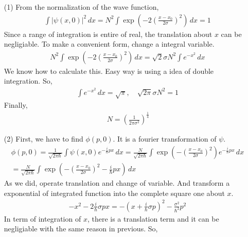 \documentclass[aps,floatfix,nofootinbib,superscriptaddress,fleqn]{revtex4}
\begin{document}
\begin{itemize}
\item[(1)] From the normalization of the wave function,
\begin{align}
          \int |\psi(x,0)|^2\,dx=N^2\int\exp\left(-2{\left(\frac{x-x_0}{2\sigma}\right)}^2\right) \,dx =1
\end{align}
Since a range of integration is entire of real, the translation about $x$ can be negligiable.
To make a convenient form, change a integral variable.
\begin{align}
          N^2\int\exp\left(-2{\left(\frac{x-x_0}{2\sigma}\right)}^2\right) \,dx
          =\sqrt{2}\sigma N^2\int e^{-x^2} \,dx
\end{align}
We know how to calculate this. Easy way is using a idea of double integration. So,
\begin{align}
          \int e^{-x^2} \,dx = \sqrt{\pi},\quad \sqrt{2\pi}\sigma N^2 =1
\end{align}
Finally,
\begin{align}
          \, N = {\left(\frac{1}{2\pi\sigma^2}\right)}^{\frac{1}{4}}
\end{align}
\item[(2)] First, we have to find $\phi(p,0)$. It is a fourier transformation of $\psi$.
\begin{align}
          \phi(p,0)=\frac{1}{\sqrt{2\pi\hbar}}\int\psi(x,0) e^{-\frac{i}{\hbar}px}\,dx
          =\frac{N}{\sqrt{2\pi\hbar}}\int\exp\left(-{\left(\frac{x-x_0}{2\sigma}\right)}^2\right) e^{-\frac{i}{\hbar}px}\,dx
          \\=\frac{N}{\sqrt{2\pi\hbar}}\int\exp\left(-{\left(\frac{x-x_0}{2\sigma}\right)}^2-\frac{i}{\hbar}px\right)\,dx
\end{align}
As we did, operate translation and change of variable. And transform a exponential of integrated function into the complete square one about $x$.
\begin{align}
          -x^2-2\frac{i}{\hbar}\sigma px = -{\left( x+\frac{i}{\hbar}\sigma p\right)}^2-\frac{\sigma^2}{\hbar^2}p^2
\end{align}
In term of integration of $x$, there is a translation term and it can be negligiable with the same reason in previous. So,

\end{itemize}
\end{document}
